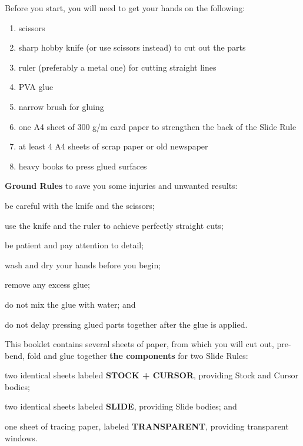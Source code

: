   \begin{multicols*}{3}
  \normalsize{Before you start, you will need to get your hands on the following:
    \begin{enumerate}
      \setlength{\parskip}{0pt}
      \setlength{\parsep}{0pt}
      \item scissors
      \item sharp hobby knife (or use scissors instead) to cut out the parts
      \item ruler (preferably a metal one) for cutting straight lines
      \item PVA glue
      \item narrow brush for gluing
      \item one A4 sheet of 300 g/m card paper to strengthen the back of the Slide Rule
      \item at least 4 A4 sheets of scrap paper or old newspaper
      \item heavy books to press glued surfaces
    \end{enumerate}

  \textbf{Ground Rules} to save you some injuries and unwanted results:
    \begin{inparaenum}
      \item be careful with the knife and the scissors;
      \item use the knife and the ruler to achieve perfectly straight cuts;
      \item be patient and pay attention to detail;
      \item wash and dry your hands before you begin;
      \item remove any excess glue;
      \item do not mix the glue with water; and
      \item do not delay pressing glued parts together after the glue is applied.
    \end{inparaenum}

  This booklet contains several sheets of paper, from which you will cut out, pre-bend, fold and glue together \textbf{the components} for two Slide Rules:
    \begin{inparaenum}
      \item two identical sheets labeled \textbf{STOCK + CURSOR}, providing Stock and Cursor bodies;
      \item two identical sheets labeled \textbf{SLIDE}, providing Slide bodies; and
      \item one sheet of tracing paper, labeled \textbf{TRANSPARENT}, providing transparent windows.
    \end{inparaenum}

}
\end{multicols*}
